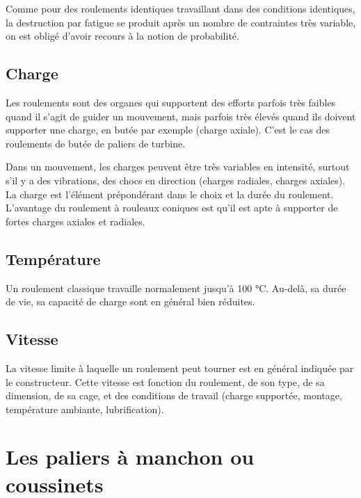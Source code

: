 Comme pour des roulements identiques travaillant dans des conditions identiques, la destruction par fatigue se produit après un nombre de contraintes très variable, on est obligé d’avoir recours à la notion de probabilité.



\subsection{	Charge}

Les roulements sont des organes qui supportent des efforts parfois très faibles quand il s’agit de guider un mouvement, mais parfois très élevés quand ils doivent supporter une charge, en butée par exemple (charge axiale). C’est le cas des roulements de butée de paliers de turbine.
\vspace{0.3cm}

Dans un mouvement, les charges peuvent être très variables en intensité, surtout s’il y a des vibrations, des chocs en direction (charges radiales, charges axiales). La charge est l’élément prépondérant dans le choix et la durée du roulement. L’avantage du roulement à rouleaux coniques est qu’il est apte à supporter de fortes charges axiales et radiales.



\subsection{	Température }


Un roulement classique travaille normalement jusqu’à 100 °C. Au-delà, sa durée de vie, sa capacité de charge sont en général bien réduites. 

\subsection{	Vitesse}


La vitesse limite à laquelle un roulement peut tourner est en général indiquée par le constructeur. Cette vitesse est fonction du roulement, de son type, de sa dimension, de sa cage, et des conditions de travail (charge supportée, montage, température ambiante, lubrification).



\section{Les paliers à manchon ou coussinets}



